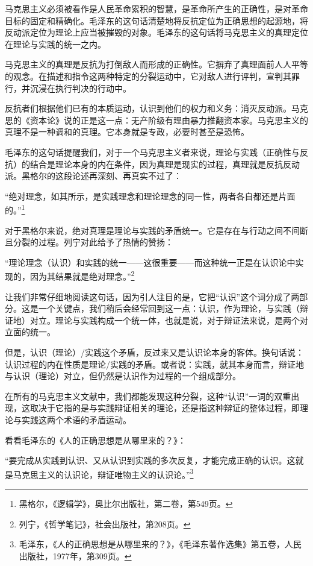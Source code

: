 \documentclass[fontset=fandol, a4paper, 12pt, twoside]{ctexart}
\renewenvironment{quote}
  {\list{}{\rightmargin=0cm \leftmargin=2em}%
   \item\relax\small\kaishu\color{black}}
  {\endlist}
\begin{document}
马克思主义必须被看作是人民革命累积的智慧，是革命所产生的正确性，是对革命目标的固定和精确化。毛泽东的这句话清楚地将反抗定位为正确思想的起源地，将反动派定位为理论上应当被摧毁的对象。毛泽东的这句话将马克思主义的真理定位在理论与实践的统一之内。

马克思主义的真理是反抗为打倒敌人而形成的正确性。它摒弃了真理面前人人平等的观念。在描述和指令这两种特定的分裂运动中，它对敌人进行评判，宣判其罪行，并沉浸在执行判决的行动中。

反抗者们根据他们已有的本质运动，认识到他们的权力和义务：消灭反动派。马克思的《资本论》说的正是这一点：无产阶级有理由暴力推翻资本家。马克思主义的真理不是一种调和的真理。它本身就是专政，必要时甚至是恐怖。

毛泽东的这句话提醒我们，对于一个马克思主义者来说，理论与实践（正确性与反抗）的结合是理论本身的内在条件，因为真理是现实的过程，真理就是反抗反动派。黑格尔的这段论述再深刻、再真实不过了：

\begin{quote}
“绝对理念，如其所示，是实践理念和理论理念的同一性，两者各自都还是片面的。”\footnote{黑格尔，《逻辑学》，奥比尔出版社，第二卷，第549页。}
\end{quote}

对于黑格尔来说，绝对真理是理论与实践的矛盾统一。它是存在与行动之间不间断且分裂的过程。列宁对此给予了热情的赞扬：

\begin{quote}
“理论理念（认识）和实践的统一——这很重要——而这种统一正是在认识论中实现的，因为其结果就是绝对理念。”\footnote{列宁，《哲学笔记》，社会出版社，第208页。}
\end{quote}

让我们非常仔细地阅读这句话，因为引人注目的是，它把“认识”这个词分成了两部分。这是一个关键点，我们稍后会经常回到这一点：认识，作为理论，与实践（辩证地）对立。理论与实践构成一个统一体，也就是说，对于辩证法来说，是两个对立面的统一。

但是，认识（理论）/实践这个矛盾，反过来又是认识论本身的客体。换句话说：认识过程的内在性质是理论/实践的矛盾。或者说：实践，就其本身而言，辩证地与认识（理论）对立，但仍然是认识作为过程的一个组成部分。

在所有的马克思主义文献中，我们都能发现这种分裂，这种“认识”一词的双重出现，这取决于它指的是与实践辩证相关的理论，还是指这种辩证的整体过程，即理论与实践这两个术语的矛盾运动。

看看毛泽东的《人的正确思想是从哪里来的？》：

\begin{quote}
“要完成从实践到认识、又从认识到实践的多次反复，才能完成正确的认识。这就是马克思主义的认识论，辩证唯物主义的认识\mbox{论。”\footnote{毛泽东，《人的正确思想是从哪里来的？》，《毛泽东著作选集》第五卷，人民出版社，1977年，第309页。}}
\end{quote}
\end{document}
